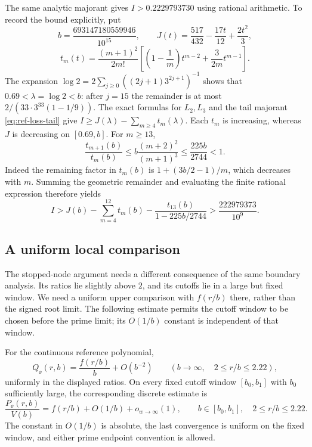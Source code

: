 \begin{remark}
\label{rem:ref-sharper-margin}
The same analytic majorant gives $I>0.2229793730$ using rational
arithmetic.  To record the bound explicitly, put
\[
 b=\frac{693147180559946}{10^{15}},\qquad
 J(t)=\frac{517}{432}-\frac{17t}{12}+\frac{2t^2}{3},
\]
\[
 t_m(t)=\frac{(m+1)^2}{2m!}
 \left[\left(1-\frac1m\right)t^{m-2}
       +\frac{3}{2m}t^{m-1}\right].
\]
The expansion
$\log2=2\sum_{j\ge0}((2j+1)3^{2j+1})^{-1}$ shows that
$0.69<\lambda=\log2<b$: after $j=15$ the remainder is at most
$2/(33\cdot3^{33}(1-1/9))$.
The exact formulas for $L_2,L_3$ and the tail majorant
\eqref{eq:ref-loss-tail} give
$I\ge J(\lambda)-\sum_{m\ge4}t_m(\lambda)$.
Each $t_m$ is increasing, whereas $J$ is decreasing on $[0.69,b]$.
For $m\ge13$,
\[
 \frac{t_{m+1}(b)}{t_m(b)}
 \le b\frac{(m+2)^2}{(m+1)^3}
 \le\frac{225b}{2744}<1.
\]
Indeed the remaining factor in $t_m(b)$ is
$1+(3b/2-1)/m$, which decreases with $m$.
Summing the geometric remainder and evaluating the finite rational
expression therefore yields
\[
 I>J(b)-\sum_{m=4}^{12}t_m(b)
          -\frac{t_{13}(b)}{1-225b/2744}
   >\frac{222979373}{10^9}.
\]
\end{remark}

\subsection{A uniform local comparison}

The stopped-node argument needs a different consequence of the same
boundary analysis.  Its ratios lie slightly above $2$, and its cutoffs
lie in a large but fixed window.  We need a uniform upper comparison
with $f(r/b)$ there, rather than the signed root limit.  The following
estimate permits the cutoff window to be chosen before the prime limit;
its $O(1/b)$ constant is independent of that window.

\begin{lemma}\label{lem:local-reference}
For the continuous reference polynomial,
\begin{equation}\label{eq:ref-local-cont}
 Q_\ee(r,b)=\frac{f(r/b)}b+O(b^{-2})
 \qquad\left(b\longrightarrow\infty,\quad2\leq r/b\leq2.22\right),
\end{equation}
uniformly in the displayed ratios.  On every fixed cutoff window
$[b_0,b_1]$ with $b_0$ sufficiently large, the corresponding discrete
estimate is
\begin{equation}\label{eq:ref-local-prime}
 \frac{P_\ee(r,b)}{V(b)}
        =f(r/b)+O(1/b)+o_{w\to\infty}(1),
 \qquad b\in[b_0,b_1],\quad2\leq r/b\leq2.22.
\end{equation}
The constant in $O(1/b)$ is absolute, the last convergence is uniform
on the fixed window, and either prime endpoint convention is allowed.
\end{lemma}

